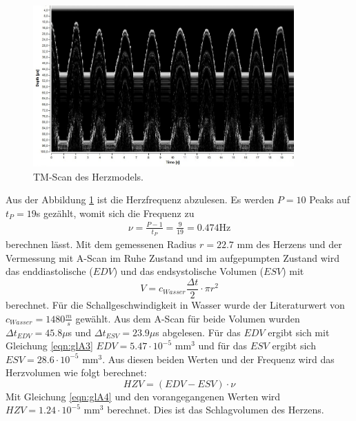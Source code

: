 \begin{figure}
  \centering
  \includegraphics[width = 10cm]{data/TMScan.jpg}
  \caption{TM-Scan des Herzmodels.}
  \label{fig:abbA5}
\end{figure}
\FloatBarrier

Aus der Abbildung \ref{fig:abbA5} ist die Herzfrequenz abzulesen.
Es werden $P = 10$ Peaks auf $t_P = 19$s gezählt, womit sich die Frequenz zu
\begin{align*}
  \nu = \frac{P-1}{t_P} = \frac{9}{19} = 0.474 \text{Hz} 
\end{align*}
berechnen lässt.
Mit dem gemessenen Radius $r = 22.7$ mm des Herzens und der Vermessung mit A-Scan im Ruhe Zustand und im aufgepumpten Zustand wird das enddiastolische ($EDV$) und das endsystolische Volumen ($ESV$) mit
\begin{equation}
  V = c_{Wasser} \frac{\Delta t}{2} \cdot \pi r^2
  \label{eqn:glA3}
\end{equation} 
berechnet.
Für die Schallgeschwindigkeit in Wasser wurde der Literaturwert von $c_{Wasser} = 1480 \frac{m}{s}$ \cite{schall} gewählt.
Aus dem A-Scan für beide Volumen wurden $\Delta t_{EDV} = 45.8 \mu $s und $\Delta t_{ESV} = 23.9 \mu$s abgelesen.
Für das $EDV$ ergibt sich mit Gleichung \ref{eqn:glA3} $EDV = 5.47 \cdot 10^{-5}$ mm$^3$ und für das $ESV$ ergibt sich $ESV = 28.6 \cdot 10^{-5}$ mm$^3$.
Aus diesen beiden Werten und der Frequenz wird das Herzvolumen wie folgt berechnet:
\begin{equation}
  HZV = (EDV - ESV) \cdot \nu
  \label{eqn:glA4}
\end{equation}
Mit Gleichung \ref{eqn:glA4} und den vorangegangenen Werten wird $HZV =  1.24 \cdot 10^{-5}$ mm$^3$ berechnet.
Dies ist das Schlagvolumen des Herzens.